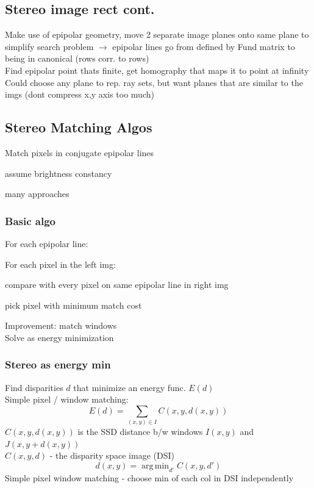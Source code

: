 \documentclass{article}
\DeclareMathOperator*{\argmin}{arg\,min}
\begin{document}
\subsection{Stereo image rect cont.}
Make use of epipolar geometry, move 2 separate image planes onto same plane to simplify
search problem $\to$ epipolar lines go from defined by Fund matrix to being in 
canonical (rows corr. to rows)
\\[5pt]
Find epipolar point thats finite, get homography that maps it to point at infinity
\\[5pt]
Could choose any plane to rep. ray sets, but want planes that are similar to the 
imgs (dont compress x,y axis too much)

\subsection{Stereo Matching Algos}
Match pixels in conjugate epipolar lines
\begin{list}{}{}
  \item assume brightness constancy
  \item many approaches
\end{list}

\subsubsection{Basic algo}
For each epipolar line:
\begin{list}{}{}
  \item For each pixel in the left img:
  \item \begin{list}{-}{}
    \item compare with every pixel on same epipolar line in right img
    \item pick pixel with minimum match cost
  \end{list}
\end{list}
Improvement: match windows
\\
Solve as energy minimization

\subsubsection{Stereo as energy min}
Find disparities $d$ that minimize an energy func. $E(d)$
\\
Simple pixel / window matching:
\[
  E(d) = \sum_{(x,y)\in I} C(x,y,d(x,y))
\]
$C(x,y,d(x,y))$ is the SSD distance b/w windows $I(x,y)$ and $J(x,y + d(x,y))$
\\
$C(x,y,d)$ - the disparity space image (DSI)
\[
  d(x,y) = \argmin_{d'} C(x,y,d')
\]
Simple pixel window matching - choose min of each col in DSI independently
\end{document}
